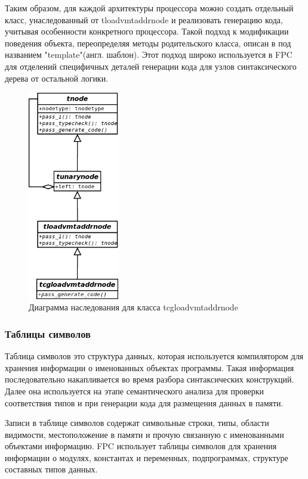 \documentclass{imcs}
\begin{document}
Таким образом, для каждой архитектуры процессора можно создать отдельный класс, 
унаследованный от tloadvmtaddrnode и реализовать генерацию кода, 
учитывая особенности конкретного процессора.
Такой подход к модификации поведения объекта, переопределяя методы родительского класса,
описан в \cite{gof} под названием "template"(англ. шаблон). Этот подход широко
используется в FPC для отделений специфичных деталей генерации кода для узлов синтаксического
дерева от остальной логики.

\begin{figure}[htb]
\centering
\includegraphics[width=150px]{./uml/cgnodeexample.png}
\caption{Диаграмма наследования для класса tcgloadvmtaddrnode}
\label{tcgloadvmtaddrnode}
\end{figure}

\pagebreak

\subsubsection{Таблицы символов}

Таблица символов это структура данных, которая используется компилятором для хранения 
информации о именованных объектах программы. Такая информация последовательно накапливается во время
разбора синтаксических конструкций. Далее она используется на этапе семантического анализа 
для проверки соответствия типов и при генерации кода для размещения данных в памяти.

Записи в таблице символов содержат символьные строки, типы, области видимости, 
местоположение в памяти и прочую связанную с именованными объектами информацию.
FPC использует таблицы символов для хранения информации о модулях,
константах и переменных, подпрограммах, структуре составных типов данных.
\end{document}
